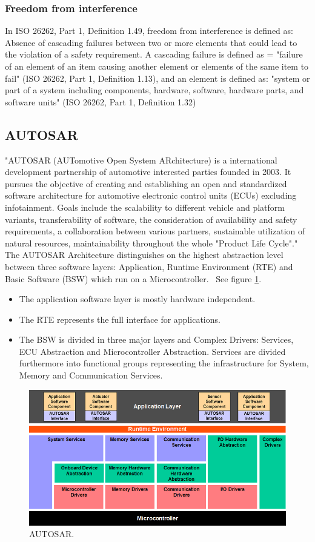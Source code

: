 \subsubsection{Freedom from interference}
In ISO 26262, Part 1, Definition 1.49, freedom from interference is defined as: Absence of cascading failures between two or more elements that could lead to the violation of a safety requirement. A cascading failure is defined as = "failure of an element of an item causing another element or elements of the same item to fail" (ISO 26262, Part 1, Definition 1.13), and an element is defined as: "system or part of a system including components, hardware, software, hardware parts, and software units" (ISO 26262, Part 1, Definition 1.32)

\subsection{AUTOSAR}
"AUTOSAR (AUTomotive Open System ARchitecture) is a international development partnership of automotive interested parties founded in 2003. It pursues the objective of creating and establishing an open and standardized software architecture for automotive electronic control units (ECUs) excluding infotainment. Goals include the scalability to different vehicle and platform variants, transferability of software, the consideration of availability and safety requirements, a collaboration between various partners, sustainable utilization of natural resources, maintainability throughout the whole "Product Life Cycle"."~\cite{website:autosar}\\

The AUTOSAR Architecture distinguishes on the highest abstraction level between three software layers: Application, Runtime Environment (RTE) and Basic Software (BSW) which run on a Microcontroller.~\cite{website:autosar} See figure \ref{fig:autosar}.
\begin{itemize}
\item The application software layer is mostly hardware independent.
\item The RTE represents the full interface for applications.
\item The BSW is divided in three major layers and Complex Drivers: Services, ECU Abstraction and Microcontroller Abstraction. Services are divided furthermore into functional groups representing the infrastructure for System, Memory and Communication Services.
\end{itemize}

\begin{figure}[H]
\centering
\includegraphics[width=\textwidth]{./img/literature_autosar.png}
\caption{AUTOSAR.~\cite{website:autosar}}\label{fig:autosar}
\end{figure}


